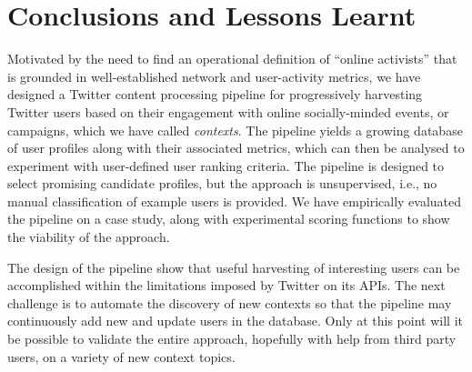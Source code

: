 \vspace{-10pt}
\section{Conclusions and Lessons Learnt}
\vspace{-10pt}


Motivated by the need to find an operational definition of ``online activists'' that is grounded in well-established network and user-activity metrics, we have designed a Twitter content processing pipeline for progressively harvesting Twitter users based on their engagement with online socially-minded events, or campaigns, which we have called \textit{contexts}.
The pipeline yields a growing database of user profiles along with their associated metrics, which can then be analysed to experiment with user-defined user ranking criteria. The pipeline is  designed to select promising candidate profiles, but the approach is unsupervised, i.e., no manual classification of example users is provided.
We have empirically evaluated the pipeline on a case study, along with experimental scoring functions to show the viability of the approach. 

The design of the pipeline show that useful harvesting of interesting users can be accomplished within the limitations imposed by Twitter on its APIs.
The next challenge is to automate the discovery of new contexts so that the pipeline may continuously add new and update users in the database.
Only at this point will it be possible to validate the entire approach, hopefully with help from third party users, on a variety of new context topics.
